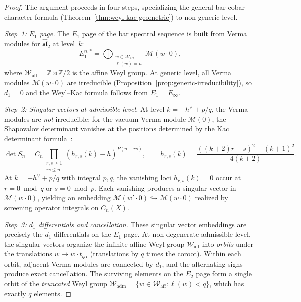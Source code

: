\begin{proof}
The argument proceeds in four steps, specializing the general
bar-cobar character formula
(Theorem~\ref{thm:weyl-kac-geometric}) to non-generic level.

\emph{Step~1: $E_1$ page.}
The $E_1$ page of the bar spectral sequence is built from
Verma modules for $\widehat{\mathfrak{sl}}_2$ at level~$k$:
\[
E_1^{n,*} = \bigoplus_{\substack{w \in \mathcal{W}_{\mathrm{aff}} \\
\ell(w) = n}} \mathcal{M}(w \cdot 0),
\]
where $\mathcal{W}_{\mathrm{aff}} = \mathbb{Z} \rtimes \mathbb{Z}/2$
is the affine Weyl group. At generic level, all Verma modules
$\mathcal{M}(w \cdot 0)$ are irreducible
(Proposition~\ref{prop:generic-irreducibility}), so $d_1 = 0$ and
the Weyl--Kac formula follows from $E_1 = E_\infty$.

\emph{Step~2: Singular vectors at admissible level.}
At level $k = -h^\vee + p/q$, the Verma modules are \emph{not}
irreducible: for the vacuum Verma module $\mathcal{M}(0)$, the
Shapovalov determinant vanishes at the positions determined by
the Kac determinant formula~\cite{Kac}:
\[
\det S_n = C_n \prod_{\substack{r,s \geq 1 \\ rs \leq n}}
(h_{r,s}(k) - h)^{P(n-rs)},
\qquad
h_{r,s}(k) = \frac{((k+2)r - s)^2 - (k+1)^2}{4(k+2)}.
\]
At $k = -h^\vee + p/q$ with integral $p,q$, the vanishing loci
$h_{r,s}(k) = 0$ occur at $r = 0 \bmod q$ or $s = 0 \bmod p$.
Each vanishing produces a singular vector in $\mathcal{M}(w \cdot 0)$,
yielding an embedding
$\mathcal{M}(w' \cdot 0) \hookrightarrow \mathcal{M}(w \cdot 0)$
realized by screening operator integrals on $\overline{C}_n(X)$.

\emph{Step~3: $d_1$ differentials and cancellation.}
These singular vector embeddings are precisely the $d_1$
differentials on the $E_1$ page. At
non-degenerate admissible level, the singular vectors organize
the infinite affine Weyl group $\mathcal{W}_{\mathrm{aff}}$ into
\emph{orbits} under the translations $w \mapsto w \cdot t_{q\alpha}$
(translations by $q$ times the coroot). Within each orbit, adjacent
Verma modules are connected by $d_1$, and the alternating signs
produce exact cancellation. The surviving elements on the $E_2$
page form a single orbit of the \emph{truncated} Weyl group
$\mathcal{W}_{\mathrm{adm}} = \{w \in \mathcal{W}_{\mathrm{aff}}
: \ell(w) < q\}$, which has exactly $q$ elements.


\end{proof}

